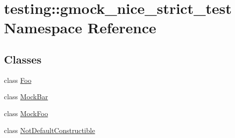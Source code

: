 \hypertarget{namespacetesting_1_1gmock__nice__strict__test}{}\section{testing\+::gmock\+\_\+nice\+\_\+strict\+\_\+test Namespace Reference}
\label{namespacetesting_1_1gmock__nice__strict__test}
\subsection*{Classes}
\begin{DoxyCompactItemize}
\item 
class \mbox{\hyperlink{classtesting_1_1gmock__nice__strict__test_1_1Foo}{Foo}}
\item 
class \mbox{\hyperlink{classtesting_1_1gmock__nice__strict__test_1_1MockBar}{Mock\+Bar}}
\item 
class \mbox{\hyperlink{classtesting_1_1gmock__nice__strict__test_1_1MockFoo}{Mock\+Foo}}
\item 
class \mbox{\hyperlink{classtesting_1_1gmock__nice__strict__test_1_1NotDefaultConstructible}{Not\+Default\+Constructible}}
\end{DoxyCompactItemize}

